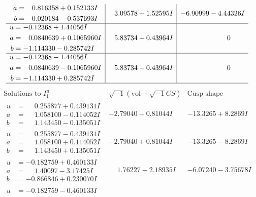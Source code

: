 \documentclass[1p]{elsarticle_modified}
\theoremstyle{definition}
\newcommand{\I}{\sqrt{-1}}
\begin{document}
$$\begin{array}{c|c|c}
\begin{aligned}
a &= \phantom{-}0.816358 + 0.152133 I \\
b &= \phantom{-}0.020184 - 0.537693 I\end{aligned}
 & \phantom{-}3.09578 + 1.52595 I & -6.90999 - 4.44326 I \\ \hline\begin{aligned}
u &= -0.12368 + 1.44056 I \\
a &= \phantom{-}0.0840639 + 0.1065960 I \\
b &= -1.114330 - 0.285742 I\end{aligned}
 & \phantom{-}5.83734 + 0.43964 I & \phantom{-0.000000 } 0 \\ \hline\begin{aligned}
u &= -0.12368 - 1.44056 I \\
a &= \phantom{-}0.0840639 - 0.1065960 I \\
b &= -1.114330 + 0.285742 I\end{aligned}
 & \phantom{-}5.83734 - 0.43964 I & \phantom{-0.000000 } 0\\
 \hline 
 \end{array}$$\newpage$$\begin{array}{c|c|c}  
\text{Solutions to }I^u_{1}& \I (\text{vol} + \sqrt{-1}CS) & \text{Cusp shape}\\
 \hline 
\begin{aligned}
u &= \phantom{-}0.255877 + 0.439131 I \\
a &= \phantom{-}1.058100 - 0.114052 I \\
b &= \phantom{-}1.143450 - 0.135051 I\end{aligned}
 & -2.79040 - 0.81044 I & -13.3265 + 8.2869 I \\ \hline\begin{aligned}
u &= \phantom{-}0.255877 - 0.439131 I \\
a &= \phantom{-}1.058100 + 0.114052 I \\
b &= \phantom{-}1.143450 + 0.135051 I\end{aligned}
 & -2.79040 + 0.81044 I & -13.3265 - 8.2869 I \\ \hline\begin{aligned}
u &= -0.182759 + 0.460133 I \\
a &= \phantom{-}1.40097 - 3.17425 I \\
b &= -0.866846 + 0.230070 I\end{aligned}
 & \phantom{-}1.76227 - 2.18935 I & -6.07240 - 3.75678 I \\ \hline\begin{aligned}
u &= -0.182759 - 0.460133 I \\

\end{aligned}
\end{array}$$
\end{document}
